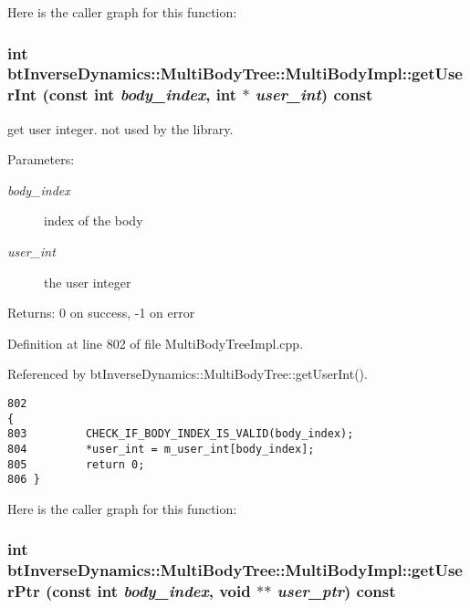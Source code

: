 Here is the caller graph for this function:\hypertarget{classbt_inverse_dynamics_1_1_multi_body_tree_1_1_multi_body_impl_8deabb1a28e38824027d3515a655cdd3}{
\subsubsection[getUserInt]{\setlength{\rightskip}{0pt plus 5cm}int btInverseDynamics::MultiBodyTree::MultiBodyImpl::getUserInt (const int {\em body\_\-index}, \/  int $\ast$ {\em user\_\-int}) const}}
\label{classbt_inverse_dynamics_1_1_multi_body_tree_1_1_multi_body_impl_8deabb1a28e38824027d3515a655cdd3}


get user integer. not used by the library. \begin{Desc}
\item[Parameters:]
\begin{description}
\item[{\em body\_\-index}]index of the body \item[{\em user\_\-int}]the user integer \end{description}
\end{Desc}
\begin{Desc}
\item[Returns:]0 on success, -1 on error \end{Desc}
 

Definition at line 802 of file MultiBodyTreeImpl.cpp.

Referenced by btInverseDynamics::MultiBodyTree::getUserInt().

\begin{Code}\begin{verbatim}802                                                                                     {
803         CHECK_IF_BODY_INDEX_IS_VALID(body_index);
804         *user_int = m_user_int[body_index];
805         return 0;
806 }
\end{verbatim}
\end{Code}




Here is the caller graph for this function:\hypertarget{classbt_inverse_dynamics_1_1_multi_body_tree_1_1_multi_body_impl_53ffec14bf9450a22e881b75f80d8495}{
\subsubsection[getUserPtr]{\setlength{\rightskip}{0pt plus 5cm}int btInverseDynamics::MultiBodyTree::MultiBodyImpl::getUserPtr (const int {\em body\_\-index}, \/  void $\ast$$\ast$ {\em user\_\-ptr}) const}}
\label{classbt_inverse_dynamics_1_1_multi_body_tree_1_1_multi_body_impl_53ffec14bf9450a22e881b75f80d8495}


